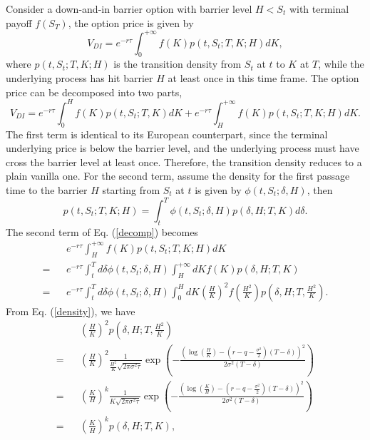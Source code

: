 \documentclass[12pt]{article}
\begin{document}
  Consider a down-and-in barrier option with barrier level $H < S_t$ with terminal payoff $f(S_T)$, the option price is given by
  \begin{equation}
    V_{DI} = e^{-r\tau}\int_{0}^{+\infty}f(K)p(t,S_t;T,K; H)dK,
  \end{equation}
  where $p(t,S_t;T,K; H)$ is the transition density from $S_t$ at $t$ to $K$ at $T$, while the underlying process has hit barrier $H$ at
  least once in this time frame. The option price can be decomposed
  into two parts,
  \begin{equation}
    V_{DI} = e^{-r\tau}\int_{0}^{H}f(K)p(t,S_t;T,K)dK + e^{-r\tau}\int_{H}^{+\infty}f(K)p(t,S_t;T,K;H)dK.
    \label{decomp}
  \end{equation}
  The first term is identical to its European counterpart, since the terminal underlying price is below the barrier level, and the underlying
  process must have cross the barrier level at least once. Therefore, the transition density reduces to a plain vanilla one. For the second term,
  assume the density for the first passage time to the barrier $H$ starting from $S_t$ at $t$ is given by $\phi(t,S_t;\delta,H)$, then
  \begin{equation}
    p(t,S_t;T,K;H) = \int_t^T \phi(t,S_t;\delta,H)p(\delta,H;T,K)d\delta.
  \end{equation}
  The second term of Eq. (\ref{decomp}) becomes
  \begin{eqnarray}
      &&e^{-r\tau}\int_{H}^{+\infty}f(K)p(t,S_t;T,K;H)dK \nonumber\\
    = &&e^{-r\tau}\int_t^Td\delta \phi(t,S_t;\delta,H)\int_{H}^{+\infty}dKf(K)p(\delta,H;T,K) \nonumber\\
    = &&e^{-r\tau}\int_t^Td\delta \phi(t,S_t;\delta,H)\int_0^HdK \left(\frac{H}{K}\right)^2f\left(\frac{H^2}{K}\right)p\left(\delta,H;T,\frac{H^2}{K}\right).
  \end{eqnarray}
  From Eq. (\ref{density}), we have
  \begin{eqnarray}
      && \left(\frac{H}{K}\right)^2p\left(\delta,H;T,\frac{H^2}{K}\right) \nonumber\\
    = && \left(\frac{H}{K}\right)^2\frac{1}{\displaystyle \frac{H^2}{K}\sqrt{2\pi\sigma^2\tau}}
    \exp\left(-\frac{\displaystyle \left(\log\left(\frac{H}{K}\right)-\left(r-q-\frac{\sigma^2}{2}\right)(T-\delta)\right)^2}{2\sigma^2(T-\delta)}\right) \nonumber\\
    = && \left(\frac{K}{H}\right)^k\frac{1}{\displaystyle K\sqrt{2\pi\sigma^2\tau}}
    \exp\left(-\frac{\displaystyle \left(\log\left(\frac{K}{H}\right)-\left(r-q-\frac{\sigma^2}{2}\right)(T-\delta)\right)^2}{2\sigma^2(T-\delta)}\right) \nonumber\\
    = && \left(\frac{K}{H}\right)^kp\left(\delta,H;T,K\right),
  \end{eqnarray}
\end{document}
